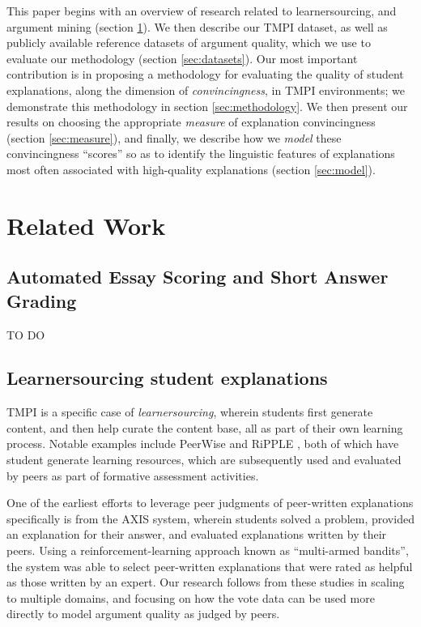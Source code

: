 \documentclass[notitlepage,12pt]{jedm}
\begin{document}
This paper begins with an overview of research related to learnersourcing,  and 
argument mining (section \ref{sec:related_work}).
We then describe our TMPI dataset, as well as publicly available reference 
datasets of argument quality, which we use to evaluate our methodology (section 
\ref{sec:datasets}).
Our most important contribution is in proposing a methodology for evaluating 
the quality of student explanations, along the dimension of 
\textit{convincingness}, in TMPI environments; we demonstrate this methodology 
in section \ref{sec:methodology}.
We then present our results on choosing the appropriate \textit{measure} of 
explanation convincingness (section \ref{sec:measure}), and finally, we 
describe how we \textit{model} these convincingness ``scores'' so as to 
identify the linguistic features of explanations most often associated with 
high-quality explanations (section \ref{sec:model}).

\section{Related Work}\label{sec:related_work}


\subsection{Automated Essay Scoring and Short Answer Grading}
TO DO

\cite{persing_modeling_2015}
\cite{nguyen_argument_2018}


\subsection{Learnersourcing student explanations}
TMPI is a specific case of  
\textit{learnersourcing}\cite{weir_learnersourcing_2015}, wherein students first
generate content, and then help curate the content base, all as part of their 
own learning process.
Notable examples include PeerWise \cite{denny_peerwise:_2008} and RiPPLE 
\cite{khosravi_ripple_2019}, both of which have student generate learning 
resources, which are subsequently used and evaluated by peers as part of 
formative assessment activities.

One of the earliest efforts to leverage peer judgments of peer-written 
explanations specifically is from the AXIS system\cite{williams_axis:_2016}, 
wherein students solved a problem, provided an explanation for their answer, 
and evaluated explanations written by their peers.
Using a reinforcement-learning approach known as ``multi-armed bandits'', the 
system was able to select peer-written explanations that were rated as helpful 
as those written by an expert.
Our research follows from these studies in scaling to multiple domains, and 
focusing on how the vote data can be used more directly to model argument 
quality as judged by peers.
\end{document}

